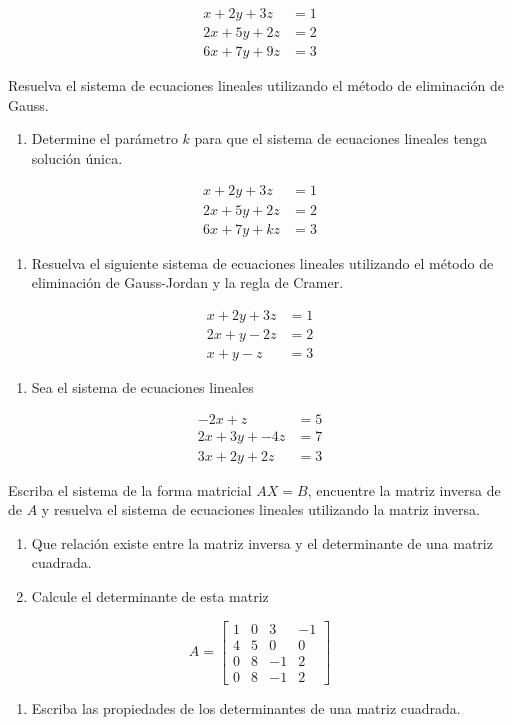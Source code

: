 \documentclass[
  letterpaper,
  DIV=11,
  numbers=noendperiod]{scrartcl}
\providecommand{\tightlist}{%
  \setlength{\itemsep}{0pt}\setlength{\parskip}{0pt}}\usepackage{longtable,booktabs,array}
\begin{document}
\[\begin{align*}
x+2y+3z&=1\\
2x+5y+2z&=2\\
6x+7y+9z&=3
\end{align*}\]

Resuelva el sistema de ecuaciones lineales utilizando el método de
eliminación de Gauss.

\begin{enumerate}
\def\labelenumi{\arabic{enumi}.}
\setcounter{enumi}{5}
\tightlist
\item
  Determine el parámetro \(k\) para que el sistema de ecuaciones
  lineales tenga solución única.
\end{enumerate}

\[\begin{align*}
x+2y+3z&=1\\
2x+5y+2z&=2\\
6x+7y+kz&=3
\end{align*}\]

\begin{enumerate}
\def\labelenumi{\arabic{enumi}.}
\setcounter{enumi}{6}
\tightlist
\item
  Resuelva el siguiente sistema de ecuaciones lineales utilizando el
  método de eliminación de Gauss-Jordan y la regla de Cramer.
\end{enumerate}

\[\begin{align*}
x+2y+3z&=1\\
2x+y-2z&=2\\
x+y-z&=3
\end{align*}\]

\begin{enumerate}
\def\labelenumi{\arabic{enumi}.}
\setcounter{enumi}{7}
\tightlist
\item
  Sea el sistema de ecuaciones lineales
\end{enumerate}

\[\begin{align*}
-2x+z&=5\\
2x+3y+-4z&=7\\
3x+2y+2z&=3 
\end{align*}\]

Escriba el sistema de la forma matricial \(AX=B\), encuentre la matriz
inversa de de \(A\) y resuelva el sistema de ecuaciones lineales
utilizando la matriz inversa.

\begin{enumerate}
\def\labelenumi{\arabic{enumi}.}
\setcounter{enumi}{8}
\item
  Que relación existe entre la matriz inversa y el determinante de una
  matriz cuadrada.
\item
  Calcule el determinante de esta matriz
\end{enumerate}

\[A= \begin{bmatrix} 1 & 0 & 3&-1 \\ 4 & 5 & 0&0 \\ 0 & 8 & -1&2\\0 & 8 & -1&2 \end{bmatrix} \]

\begin{enumerate}
\def\labelenumi{\arabic{enumi}.}
\setcounter{enumi}{10}
\tightlist
\item
  Escriba las propiedades de los determinantes de una matriz cuadrada.
\end{enumerate}
\end{document}

